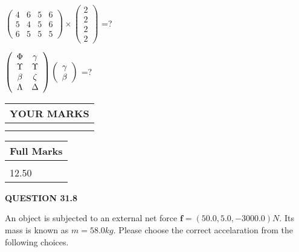 \documentclass[12pt]{article}
\begin{document}
  
 
$ \left( \begin{array}{ccccccccc}
           4 & 
           6 & 
           5 & 
           6 \\ 
           5 & 
           4 & 
           5 & 
           6 \\ 
           6 & 
           5 & 
           5 & 
           5
\end{array}\right) \times
\left( \begin{array}{c}
           2 \\ 
           2 \\ 
           2 \\ 
           2
\end{array}\right) $ =?
 
 
$  %
 \left( \begin{array}
 {
 c
 c
 }
 \Phi & 
 \gamma \\ 
 \Upsilon & 
 \Upsilon \\ 
 \beta & 
                    \zeta \\ 
 \Lambda & 
 \Delta
 \end{array} \right)
 \left( \begin{array}
 {
 c
 }
 \gamma \\ 
 \beta
 \end{array} \right)
$ =?
 

 

 
\vspace{0.3in}
  
\vspace{0.2in}
  
\noindent\begin{tabular}{|l|}
\hline
 YOUR MARKS  \\
\hline
 \\ 
 \\ 
\hline
\end{tabular}
\hspace{0.05in} \begin{tabular}{|l|}
\hline
 Full Marks  \\
\hline
 \\ 
12.50 \\
\hline
\end{tabular}
{\textbf{\Large{QUESTION
31.8 
}}}
  
  
 
An object is subjected to an external net force $\mathbf{f}=
(50.0 , 5.0 , -3000.0) N$.
Its mass is known as $m= %
58.0 kg$.
Please choose the correct accelaration from the following choices.
  
\end{document}
